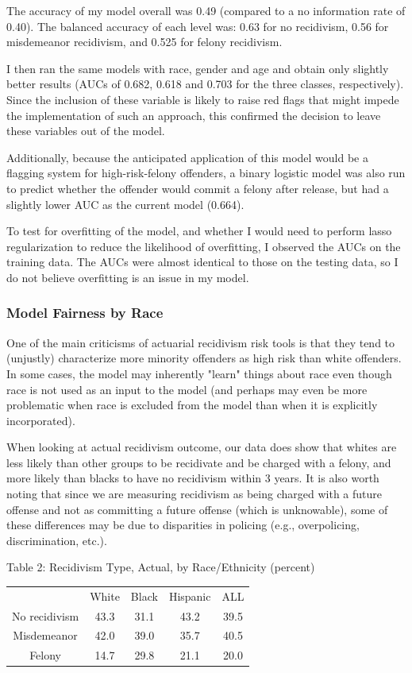 \documentclass{article}
\begin{document}
The accuracy of my model overall was 0.49 (compared to a no information rate of 0.40). The balanced accuracy of each level was: 0.63 for no recidivism, 0.56 for misdemeanor recidivism, and 0.525 for felony recidivism. 

I then ran the same models with race, gender and age and obtain only slightly better results (AUCs of 0.682, 0.618 and 0.703 for the three classes, respectively). Since the inclusion of these variable is likely to raise red flags that might impede the implementation of such an approach, this confirmed the decision to leave these variables out of the model. 

Additionally, because the anticipated application of this model would be a flagging system for high-risk-felony offenders, a binary logistic model was also run to predict whether the offender would commit a felony after release, but had a slightly lower AUC as the current model (0.664).

To test for overfitting of the model, and whether I would need to perform lasso regularization to reduce the likelihood of overfitting, I observed the AUCs on the training data. The AUCs were almost identical to those on the testing data, so I do not believe overfitting is an issue in my model. 

\subsubsection{Model Fairness by Race}

One of the main criticisms of actuarial recidivism risk tools is that they tend to (unjustly) characterize more minority offenders as high risk than white offenders.\cite{propub} In some cases, the model may inherently "learn" things about race even though race is not used as an input to the model (and perhaps may even be more problematic when race is excluded from the model than when it is explicitly incorporated). 

When looking at actual recidivism outcome, our data does show that whites are less likely than other groups to be recidivate and be charged with a felony, and more likely than blacks to have no recidivism within 3 years. It is also worth noting that since we are measuring recidivism as being charged with a future offense and not as committing a future offense (which is unknowable), some of these differences may be due to disparities in policing (e.g., overpolicing, discrimination, etc.).  

\begin{center}
Table 2: Recidivism Type, Actual, by Race/Ethnicity (percent)
\begin{tabular}{ c c c c c }
  & White & Black & Hispanic & ALL \\ 
 No recidivism & 43.3 & 31.1 & 43.2 & 39.5 \\ 
 Misdemeanor & 42.0 & 39.0 & 35.7 & 40.5 \\ 
 Felony & 14.7 & 29.8 & 21.1 & 20.0\\ 
\end{tabular}
\end{center}
\end{document}
